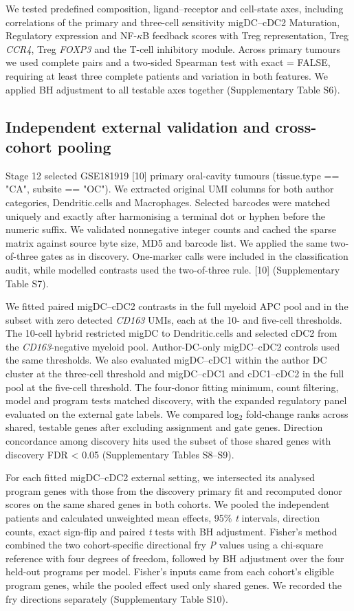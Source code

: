 \documentclass[11pt,a4paper]{article}
\begin{document}
We tested predefined composition, ligand--receptor and cell-state axes, including correlations of the primary and three-cell sensitivity migDC--cDC2 Maturation, Regulatory expression and NF-$\kappa$B feedback scores with Treg representation, Treg \textit{CCR4}, Treg \textit{FOXP3} and the T-cell inhibitory module. Across primary tumours we used complete pairs and a two-sided Spearman test with exact = FALSE, requiring at least three complete patients and variation in both features. We applied BH adjustment to all testable axes together (Supplementary Table S6).

\subsection{Independent external validation and cross-cohort pooling}
Stage 12 selected GSE181919 [10] primary oral-cavity tumours (tissue.type == "CA", subsite == "OC"). We extracted original UMI columns for both author categories, Dendritic.cells and Macrophages. Selected barcodes were matched uniquely and exactly after harmonising a terminal dot or hyphen before the numeric suffix. We validated nonnegative integer counts and cached the sparse matrix against source byte size, MD5 and barcode list. We applied the same two-of-three gates as in discovery. One-marker calls were included in the classification audit, while modelled contrasts used the two-of-three rule. [10] (Supplementary Table S7).

We fitted paired migDC--cDC2 contrasts in the full myeloid APC pool and in the subset with zero detected \textit{CD163} UMIs, each at the 10- and five-cell thresholds. The 10-cell hybrid restricted migDC to Dendritic.cells and selected cDC2 from the \textit{CD163}-negative myeloid pool. Author-DC-only migDC--cDC2 controls used the same thresholds. We also evaluated migDC--cDC1 within the author DC cluster at the three-cell threshold and migDC--cDC1 and cDC1--cDC2 in the full pool at the five-cell threshold. The four-donor fitting minimum, count filtering, model and program tests matched discovery, with the expanded regulatory panel evaluated on the external gate labels. We compared log$_{2}$ fold-change ranks across shared, testable genes after excluding assignment and gate genes. Direction concordance among discovery hits used the subset of those shared genes with discovery FDR < 0.05 (Supplementary Tables S8--S9).

For each fitted migDC--cDC2 external setting, we intersected its analysed program genes with those from the discovery primary fit and recomputed donor scores on the same shared genes in both cohorts. We pooled the independent patients and calculated unweighted mean effects, 95\% \textit{t} intervals, direction counts, exact sign-flip and paired \textit{t} tests with BH adjustment. Fisher's method combined the two cohort-specific directional fry \textit{P} values using a chi-square reference with four degrees of freedom, followed by BH adjustment over the four held-out programs per model. Fisher's inputs came from each cohort's eligible program genes, while the pooled effect used only shared genes. We recorded the fry directions separately (Supplementary Table S10).
\end{document}
